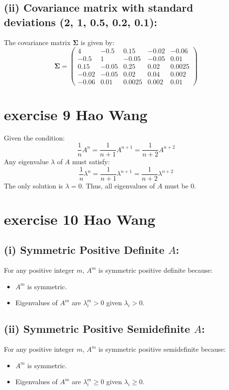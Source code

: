 \documentclass{article}
\let\normalSigma\Sigma
\renewcommand{\Sigma}{\bm{\normalSigma}} %
\begin{document}
\subsection*{(ii) Covariance matrix with standard deviations (2, 1, 0.5, 0.2, 0.1):}

The covariance matrix \(\Sigma\) is given by:
\[
\Sigma = \begin{pmatrix}
4 & -0.5 & 0.15 & -0.02 & -0.06 \\
-0.5 & 1 & -0.05 & -0.05 & 0.01 \\
0.15 & -0.05 & 0.25 & 0.02 & 0.0025 \\
-0.02 & -0.05 & 0.02 & 0.04 & 0.002 \\
-0.06 & 0.01 & 0.0025 & 0.002 & 0.01
\end{pmatrix}
\]


\section{exercise 9 Hao Wang}

Given the condition:
\[
\frac{1}{n}A^n = \frac{1}{n+1}A^{n+1} = \frac{1}{n+2}A^{n+2}
\]
Any eigenvalue \(\lambda\) of \(A\) must satisfy:
\[
\frac{1}{n}\lambda^n = \frac{1}{n+1}\lambda^{n+1} = \frac{1}{n+2}\lambda^{n+2}
\]
The only solution is \(\lambda = 0\). Thus, all eigenvalues of \(A\) must be 0.


\section{exercise 10 Hao Wang}

\subsection*{(i) Symmetric Positive Definite \(A\):}

For any positive integer \(m\), \(A^m\) is symmetric positive definite because:
\begin{itemize}
    \item \(A^m\) is symmetric.
    \item Eigenvalues of \(A^m\) are \(\lambda_i^m > 0\) given \(\lambda_i > 0\).
\end{itemize}

\subsection*{(ii) Symmetric Positive Semidefinite \(A\):}

For any positive integer \(m\), \(A^m\) is symmetric positive semidefinite because:
\begin{itemize}
    \item \(A^m\) is symmetric.
    \item Eigenvalues of \(A^m\) are \(\lambda_i^m \geq 0\) given \(\lambda_i \geq 0\).
\end{itemize}
\end{document}
